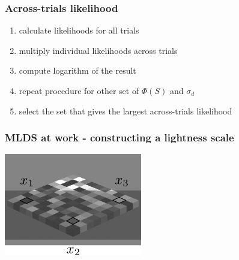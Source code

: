 \documentclass[]{beamer}
\begin{document}
\begin{frame}
 \frametitle{Across-trials likelihood}
\begin{overlayarea}{120mm}{80mm}
\begin{enumerate}
\setlength{\itemsep}{10pt}
 \item calculate likelihoods for all trials
 \item multiply individual likelihoods across trials
 \item compute logarithm of the result
 \item repeat procedure for other set of $\Phi(S)$ and $\sigma_d$
 \item select the set that gives the largest across-trials likelihood
\end{enumerate}
\end{overlayarea}
\end{frame}



\begin{frame}
\frametitle{MLDS at work - constructing a lightness scale}

\begin{overlayarea}{130mm}{60mm}
\begin{center}
 \includegraphics[width=60mm]{figs/l6/adelson_triad.png}

\vspace{5mm}
\end{center}

\end{overlayarea}
\end{frame}
\end{document}

